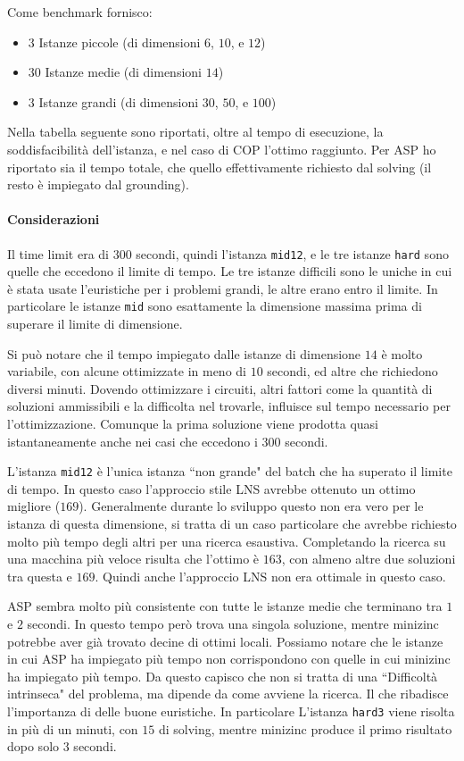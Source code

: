 \documentclass[11pt, a4paper]{article}
\begin{document}
Come benchmark fornisco:

\begin{itemize}
    \item $3$ Istanze piccole (di dimensioni $6$, $10$, e $12$)
    \item $30$ Istanze medie (di dimensioni $14$)
    \item $3$ Istanze grandi (di dimensioni $30$, $50$, e $100$)
\end{itemize}

Nella tabella seguente sono riportati, oltre al tempo di esecuzione, la soddisfacibilità dell'istanza, e nel caso di COP l'ottimo raggiunto.
Per ASP ho riportato sia il tempo totale, che quello effettivamente richiesto dal solving (il resto è impiegato dal grounding).



\paragraph{Considerazioni}
Il time limit era di $300$ secondi, quindi l'istanza \lstinline{mid12}, e le tre istanze \lstinline{hard} sono quelle che eccedono il limite di tempo.
Le tre istanze difficili sono le uniche in cui è stata usate l'euristiche per i problemi grandi, le altre erano entro il limite. In particolare le istanze \lstinline{mid} sono esattamente la dimensione massima prima di superare il limite di dimensione.

Si può notare che il tempo impiegato dalle istanze di dimensione $14$ è molto variabile, con alcune ottimizzate in meno di $10$ secondi, ed altre che richiedono diversi minuti.
Dovendo ottimizzare i circuiti, altri fattori come la quantità di soluzioni ammissibili e la difficolta nel trovarle, influisce sul tempo necessario per l'ottimizzazione.
Comunque la prima soluzione viene prodotta quasi istantaneamente anche nei casi che eccedono i $300$ secondi.

L'istanza \lstinline{mid12} è l'unica istanza ``non grande" del batch che ha superato il limite di tempo. In questo caso l'approccio stile LNS avrebbe ottenuto un ottimo migliore ($169$).
Generalmente durante lo sviluppo questo non era vero per le istanza di questa dimensione, si tratta di un caso particolare che avrebbe richiesto molto più tempo degli altri per una ricerca esaustiva.
Completando la ricerca su una macchina più veloce risulta che l'ottimo è $163$, con almeno altre due soluzioni tra questa e $169$. Quindi anche l'approccio LNS non era ottimale in questo caso.

ASP sembra molto più consistente con tutte le istanze medie che terminano tra $1$ e $2$ secondi. In questo tempo però trova una singola soluzione, mentre minizinc potrebbe aver già trovato decine di ottimi locali.
Possiamo notare che le istanze in cui ASP ha impiegato più tempo non corrispondono con quelle in cui minizinc ha impiegato più tempo.
Da questo capisco che non si tratta di una ``Difficoltà intrinseca" del problema, ma dipende da come avviene la ricerca. Il che ribadisce l'importanza di delle buone euristiche.
In particolare L'istanza \lstinline{hard3} viene risolta in più di un minuti, con $15$ di solving, mentre minizinc produce il primo risultato dopo solo $3$ secondi.
\end{document}
